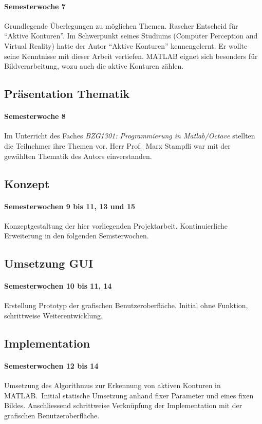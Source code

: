 \paragraph{Semesterwoche 7}
Grundlegende Überlegungen zu möglichen Themen. Rascher Entscheid für ``Aktive Konturen''. Im Schwerpunkt seines Studiums (Computer Perception and Virtual Reality) hatte der Autor ``Aktive Konturen'' kennengelernt. Er wollte seine Kenntnisse mit dieser Arbeit vertiefen. MATLAB eignet sich besonders für Bildverarbeitung, wozu auch die aktive Konturen zählen.

\subsection{Präsentation Thematik}
\label{subsec:topicpres}
\paragraph{Semesterwoche 8}
Im Unterricht des Faches \textit{BZG1301: Programmierung in Matlab/Octave} stellten die Teilnehmer ihre Themen vor. Herr Prof.\ Marx Stampfli war mit der gewählten Thematik des Autors einverstanden.

\subsection{Konzept}
\label{subsec:concept}
\paragraph{Semesterwochen 9 bis 11, 13 und 15}
Konzeptgestaltung der hier vorliegenden Projektarbeit. Kontinuierliche Erweiterung in den folgenden Semsterwochen.

\subsection{Umsetzung GUI}
\label{subsec:gui}
\paragraph{Semesterwochen 10 bis 11, 14}
Erstellung Prototyp der grafischen Benutzeroberfläche. Initial ohne Funktion, schrittweise Weiterentwicklung.

\subsection{Implementation}
\label{subsec:impl}
\paragraph{Semesterwochen 12 bis 14}
Umsetzung des Algorithmus zur Erkennung von aktiven Konturen in MATLAB.\ Initial statische Umsetzung anhand fixer Parameter und eines fixen Bildes. Anschliessend schrittweise Verknüpfung der Implementation mit der grafischen Benutzeroberfläche.
